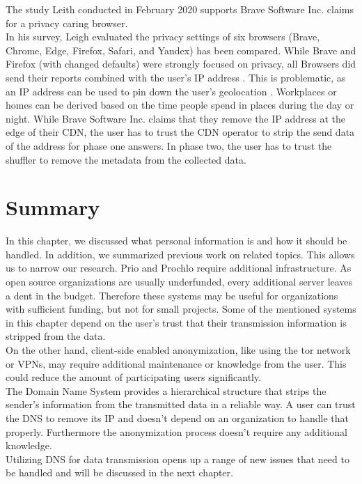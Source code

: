         The study Leith conducted in February 2020  \cite{leith_web_2020} supports Brave Software Inc. claims
        for a privacy caring browser.\\
        In his survey, Leigh evaluated the privacy settings of six browsers (Brave, Chrome, Edge, Firefox, Safari, and Yandex) has been compared. While Brave and Firefox (with changed defaults) were strongly focused on privacy, all Browsers did send their reports combined with the user's IP address \cite{leith_web_2020}.
        This is problematic, as an IP address can be used to pin down the user's geolocation \cite{koch_geolocation_2013}. Workplaces or homes can be derived based on the time people spend in places during the day or night. 
        While Brave Software Inc. claims that they remove the IP address at the edge of their CDN, the user has to trust the CDN operator to strip the send data of the address for phase one answers. In phase two, the user has to trust the shuffler to remove the metadata from the collected data. 
\newpage

\section{Summary}
    In this chapter, we discussed what personal information is and how it should be handled.
    In addition, we summarized previous work on related topics. This allows us to narrow our research.
    Prio and Prochlo require additional infrastructure. As open source organizations are usually underfunded, every additional server leaves a dent in the budget. Therefore these systems may be
    useful for organizations with sufficient funding, but not for small projects. Some of the mentioned systems in this chapter depend on the user's trust that their transmission information is stripped from the data.\\
    
    On the other hand, client-side enabled anonymization, like using the tor network or VPNs, may require additional maintenance or knowledge from the user. This could reduce the amount of participating users significantly.\\
    
    The Domain Name System provides a hierarchical structure that strips the sender's information from the transmitted data in a reliable way. A user can trust the DNS to remove its IP and doesn't depend on an organization to handle that properly. Furthermore the anonymization process doesn't require any additional knowledge.\\
    Utilizing DNS for data transmission opens up a range of new issues that need to be handled and will be discussed in the next chapter.\\ 

%


  